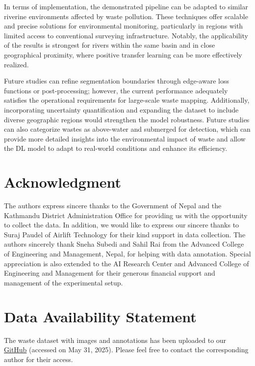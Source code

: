 \documentclass{ieeeaccess}
\begin{document}
In terms of implementation, the demonstrated pipeline can be adapted to similar riverine environments affected by waste pollution. These techniques offer scalable and precise solutions for environmental monitoring, particularly in regions with limited access to conventional surveying infrastructure. Notably, the applicability of the results is strongest for rivers within the same basin and in close geographical proximity, where positive transfer learning can be more effectively realized.

Future studies can refine segmentation boundaries through edge-aware loss functions or post-processing; however, the current performance adequately satisfies the operational requirements for large-scale waste mapping. Additionally, incorporating uncertainty quantification and expanding the dataset to include diverse geographic regions would strengthen the model robustness. Future studies can also categorize wastes as above-water and submerged for detection, which can provide more detailed insights into the environmental impact of waste and allow the DL model to adapt to real-world conditions and enhance its efficiency.

\section*{Acknowledgment}
The authors express sincere thanks to the Government of Nepal and the Kathmandu District Administration Office for providing us with the opportunity to collect the data. In addition, we would like to express our sincere thanks to Suraj Paudel of Airlift Technology for their kind support in data collection. The authors sincerely thank Sneha Subedi and Sahil Rai from the Advanced College of Engineering and Management, Nepal, for helping with data annotation. Special appreciation is also extended to the AI Research Center and Advanced College of Engineering and Management for their generous financial support and management of the experimental setup.

\section*{Data Availability Statement}
The waste dataset with images and annotations has been uploaded to our \href{https://github.com/AI-research-center/Leveraging-UAV-Data-and-Deep-learning-Models-for-Detecting-Waste-in-Rivers}{GitHub} (accessed on May 31, 2025). Please feel free to contact the corresponding author for their access.
\end{document}
